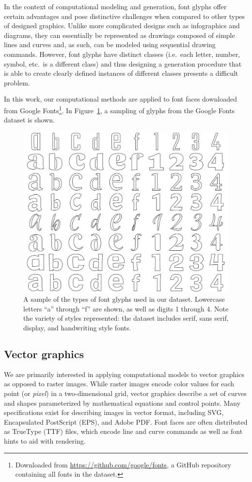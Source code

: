 In the context of computational modeling and generation, font glyphs offer certain advantages and pose distinctive challenges when compared to other types of designed graphics.
Unlike more complicated designs such as infographics and diagrams, they can essentially be represented as drawings composed of simple lines and curves and, as such, can be modeled using sequential drawing commands.
However, font glyphs have distinct classes (i.e.\ each letter, number, symbol, etc.\ is a different class) and thus designing a generation procedure that is able to create clearly defined instances of different classes presents a difficult problem.

In this work, our computational methods are applied to font faces downloaded from Google Fonts\footnote{Downloaded from \url{https://github.com/google/fonts}, a GitHub repository containing all fonts in the dataset.}.
In Figure~\ref{fig:input_fonts}, a sampling of glyphs from the Google Fonts dataset is shown.

\begin{figure}[]
	\includegraphics[width=\textwidth]{figures/input_fonts}
    \caption[A sample of the types of font faces used in our fonts dataset]{A sample of the types of font glyphs used in our dataset. Lowercase letters ``a'' through ``f'' are shown, as well as digits 1 through 4. Note the variety of styles represented: the dataset includes serif, sans serif, display, and handwriting style fonts.\label{fig:input_fonts}}
\end{figure}

\subsection{Vector graphics}
We are primarily interested in applying computational models to vector graphics as opposed to raster images.
While raster images encode color values for each point (or \textit{pixel}) in a two-dimensional grid, vector graphics describe a set of curves and shapes parameterized by mathematical equations and control points.
Many specifications exist for describing images in vector format, including SVG, Encapsulated PostScript (EPS), and Adobe PDF\@.
Font faces are often distributed as TrueType (TTF) files, which encode line and curve commands as well as font hints to aid with rendering.

